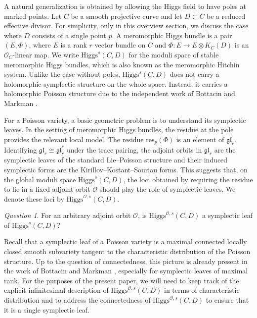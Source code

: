 \documentclass[11pt]{amsart}
\theoremstyle{plain}
\theoremstyle{definition}
\theoremstyle{remark}
\newtheorem{ques}[theorem]{Question}
\newcommand{\cO}{\mathcal O}
\newcommand{\Higgs}{\mathrm{Higgs}}
\def\res{\mathrm{res}}
\begin{document}
A natural generalization is obtained by allowing the Higgs field to have poles at marked points. Let $C$ be a smooth projective curve and let $D\subset C$ be a reduced effective divisor. For simplicity, only in this overview section, we discuss the case where $D$ consists of a single point $p$. A meromorphic Higgs bundle is a pair $(E,\Phi)$, where $E$ is a rank $r$ vector bundle on $C$ and $\Phi:E\to E\otimes K_C(D)$ is an $\mathcal O_C$-linear map. We write $\Higgs^s(C,D)$ for the moduli space of stable meromorphic Higgs bundles, which is also known as the meromorphic Hitchin system. Unlike the case without poles, $\Higgs^s(C,D)$ does not carry a holomorphic symplectic structure on the whole space. Instead, it carries a holomorphic Poisson structure due to the independent work of Bottacin \cite{Bottacin1995symplectic} and Markman \cite{markmanspectral}.


For a Poisson variety, a basic geometric problem is to understand its symplectic leaves. In the setting of meromorphic Higgs bundles, the residue at the pole provides the relevant local model. The residue $\res_p(\Phi)$ is an element of $\mathfrak{gl}_r$. Identifying $\mathfrak{gl}_r\cong \mathfrak{gl}_r^*$ under the trace pairing, the adjoint orbits in $\mathfrak{gl}_r$  are the symplectic leaves of the standard Lie--Poisson structure and their induced symplectic forms are the Kirillov--Kostant--Souriau forms. This suggests that, on the global moduli space $\Higgs^s(C,D)$, the loci obtained by requiring the residue to lie in a fixed adjoint orbit $\cO$ should play the role of symplectic leaves. We denote these loci by $\Higgs^{\cO,s}(C,D)$. 

\begin{ques}
For an arbitrary adjoint orbit $\cO$, is $\Higgs^{\mathcal O,s}(C,D)$ a symplectic leaf of $\Higgs^s(C,D)$? 
\end{ques}
Recall that a symplectic leaf of a Poisson variety is a maximal connected locally closed smooth subvariety tangent to the characteristic distribution of the Poisson structure. Up to the question of connectedness, this picture is already present in the work of Bottacin \cite[Theorem 4.7.5]{Bottacin1995symplectic} and Markman \cite[Corollary 8.10]{markmanspectral}, especially for symplectic leaves of maximal rank. For the purposes of the present paper, we will need to keep track of the explicit infinitesimal description of $\Higgs^{\cO,s}(C,D)$ in terms of characteristic distribution and to address the connectedness of $\Higgs^{\cO,s}(C,D)$ to ensure that it is a single symplectic leaf. 
\end{document}

